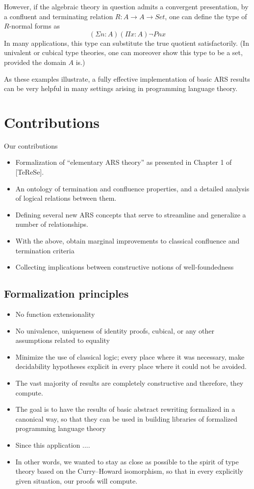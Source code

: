 \documentclass{scrartcl}
\newcommand{\hired}[1]{{\color{red}{#1}}}
\begin{document}
However, if the algebraic theory in question admits a convergent presentation,
by a confluent and terminating relation $R : A \to A \to Set$, one can define the type of
$R$-normal forms as
\[  (\Sigma n : A) (\Pi x : A) \lnot P n x \]
In many applications, this type can substitute the true quotient satisfactorily.
(In univalent or cubical type theories, one can moreover show this type to be
a set, provided the domain $A$ is.)

As these examples illustrate, a fully effective implementation of basic ARS results
can be very helpful in many settings arising in programming language theory.

\section{Contributions}
Our contributions
\begin{itemize}
  \item Formalization of ``elementary ARS theory'' as presented in
  Chapter 1 of [TeReSe].
  \item An ontology of termination and confluence properties, and a detailed analysis of logical relations between them.
  \item Defining several new ARS concepts that serve to streamline and generalize a number of relationships.
  \item With the above, obtain marginal improvements to classical confluence and termination criteria
  \item Collecting implications between constructive notions of well-foundedness
\end{itemize}

\subsection{Formalization principles}
\hired{One of our design goals is to stay within pure type theory as much as possible,
therefore we adopt the following principles.}


\begin{itemize}
  \item No function extensionality
  \item No univalence, uniqueness of identity proofs, cubical, or any other
  assumptions related to equality
  \item Minimize the use of classical logic; every place where it was necessary,
  make decidability hypotheses explicit in every place where it could not be avoided.
  \item The vast majority of results are completely constructive and therefore,
  they compute.
  \item The goal is to have the results of basic abstract rewriting
  formalized in a canonical way, so that they can be used in building
  libraries of formalized programming language theory
  \item Since this application ....
  \item In other words, we wanted to stay as close as possible to the spirit of type theory based on the Curry--Howard isomorphism, so that in every explicitly given situation, our proofs will compute.
\end{itemize}
\end{document}
